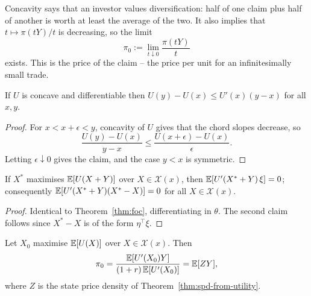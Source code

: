 \documentclass[a4paper]{scrartcl}
\begin{document}
Concavity says that an investor values diversification: half of one claim plus half of another is worth at least the average of the two. It also implies that $t \mapsto \pi(tY)/t$ is decreasing, so the limit
$$
\pi_0 := \lim_{t\downarrow 0}\frac{\pi(tY)}{t}
$$
exists. This is the  price of the claim -- the price per unit for an infinitesimally small trade.

\begin{lemma}\label{lem:supporting}
	If $U$ is concave and differentiable then $U(y) - U(x) \leq U'(x)(y-x)$ for all $x,y$.
\end{lemma}

\begin{proof}
	For $x < x + \epsilon < y$, concavity of $U$ gives that the chord slopes decrease, so
	$$
	\frac{U(y)-U(x)}{y-x} \leq \frac{U(x+\epsilon)-U(x)}{\epsilon}.
	$$
	Letting $\epsilon \downarrow 0$ gives the claim, and the case $y < x$ is symmetric.
\end{proof}

\begin{lemma}\label{lem:foc-with-claim}
	If $X^*$ maximises $\mathbb{E}[U(X+Y)]$ over $X \in \mathcal{X}(x)$, then $\mathbb{E}[U'(X^*+Y)\,\xi] = 0$; consequently $\mathbb{E}[U'(X^*+Y)(X^* - X)] = 0$ for all $X \in \mathcal{X}(x)$.
\end{lemma}

\begin{proof}
	Identical to Theorem~\ref{thm:foc}, differentiating in $\theta$. The second claim follows since $X^* - X$ is of the form $\eta^\top\xi$.
\end{proof}

\begin{theorem}\label{thm:marginal}
	Let $X_0$ maximise $\mathbb{E}[U(X)]$ over $X \in \mathcal{X}(x)$. Then
	$$
	\pi_0 = \frac{\mathbb{E}[U'(X_0)Y]}{(1+r)\,\mathbb{E}[U'(X_0)]} = \mathbb{E}[ZY],
	$$
	where $Z$ is the state price density of Theorem~\ref{thm:spd-from-utility}.
\end{theorem}
\end{document}
